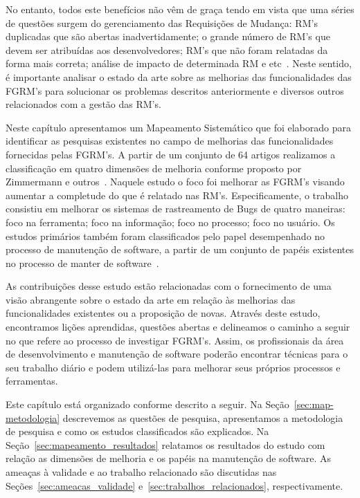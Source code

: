 No entanto, todos este benefícios não vêm de graça tendo em vista que uma séries
de questões surgem do gerenciamento das Requisições de Mudança: RM's duplicadas
que são abertas inadvertidamente; o grande número de RM's que devem ser
atribuídas aos desenvolvedores; RM's que não foram relatadas da forma mais
correta; análise de impacto de determinada RM e
etc~\cite{cavalcanti2014challenges}. Neste sentido, é importante analisar o
estado da arte sobre as melhorias das funcionalidades das FGRM's para solucionar
os problemas descritos anteriormente e diversos outros relacionados com a gestão
das RM's.

Neste capítulo apresentamos um Mapeamento Sistemático que foi elaborado para
identificar as pesquisas existentes no campo de melhorias das funcionalidades
fornecidas pelas FGRM's. A partir de um conjunto de 64 artigos realizamos a
classificação em quatro dimensões de melhoria conforme proposto por Zimmermann e
outros~\cite{zimmermann2009improving}. Naquele estudo o foco foi melhorar as
FGRM's visando aumentar a completude do que é relatado nas RM's.
Especificamente, o trabalho consistiu em melhorar os sistemas de rastreamento de
Bugs de quatro maneiras: foco na ferramenta; foco na informação; foco no
processo; foco no usuário. Os estudos primários também  foram classificados pelo
papel desempenhado no processo de manutenção de software, a partir de um
conjunto de papéis existentes no processo de manter de software~\cite{Polo1999}.

As contribuições desse estudo estão relacionadas com o fornecimento de uma visão
abrangente sobre o estado da arte em relação às melhorias das funcionalidades
existentes ou a proposição de novas. Através deste estudo, encontramos lições
aprendidas, questões abertas e delineamos o caminho a seguir no que refere ao
processo de investigar FGRM's. Assim, os profissionais da área de
desenvolvimento e manutenção de software poderão encontrar técnicas para o seu
trabalho diário e podem utilizá-las para melhorar seus próprios processos e
ferramentas.

Este capítulo está organizado conforme descrito a seguir. Na
Seção~\ref{sec:map-metodologia} descrevemos as questões de pesquisa,
apresentamos a metodologia de pesquisa e como os estudos classificados são
explicados.  Na Seção~\ref{sec:mapeamento_resultados} relatamos os resultados do
estudo com relação as dimensões de melhoria e os papéis na manutenção de
software. As ameaças à validade e ao trabalho relacionado são discutidas nas
Seções~\ref{sec:ameacas_validade} e~\ref{sec:trabalhos_relacionados},
respectivamente.

